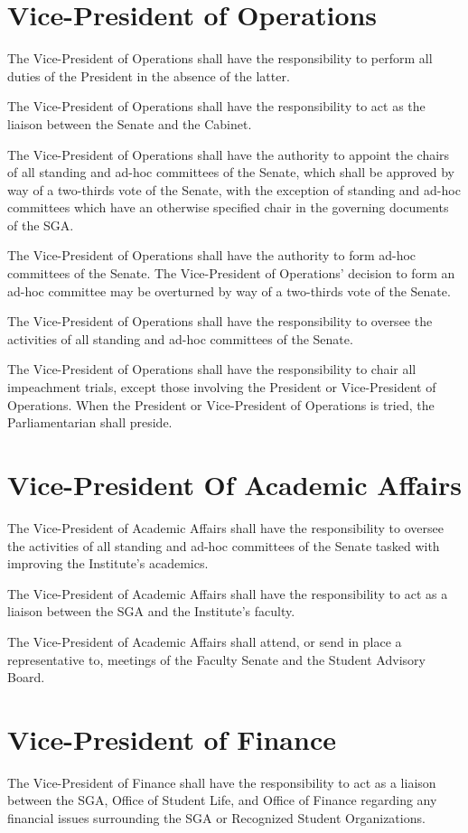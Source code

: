 \documentclass[12pt,oneside]{scrreprt}
\begin{document}
\section{Vice-President of Operations}
The Vice-President of Operations shall have the responsibility to perform all duties of the President in the absence of the latter.

The Vice-President of Operations shall have the responsibility to act as the liaison between the Senate and the Cabinet.

The Vice-President of Operations shall have the authority to appoint the chairs of all standing and ad-hoc committees of the Senate, which shall be approved by way of a two-thirds vote of the Senate, with the exception of standing and ad-hoc committees which have an otherwise specified chair in the governing documents of the SGA.

The Vice-President of Operations shall have the authority to form ad-hoc committees of the Senate. The Vice-President of Operations' decision to form an ad-hoc committee may be overturned by way of a two-thirds vote of the Senate.

The Vice-President of Operations shall have the responsibility to oversee the activities of all standing and ad-hoc committees of the Senate.

The Vice-President of Operations shall have the responsibility to chair all impeachment trials, except those involving the President or Vice-President of Operations. When the President or Vice-President of Operations is tried, the Parliamentarian shall preside.

\section{Vice-President Of Academic Affairs}
The Vice-President of Academic Affairs shall have the responsibility to oversee the activities of all standing and ad-hoc committees of the Senate tasked with improving the Institute's academics.

The Vice-President of Academic Affairs shall have the responsibility to act as a
liaison between the SGA and the Institute's faculty.

The Vice-President of Academic Affairs shall attend, or send in place a representative to, meetings of the Faculty Senate and the Student Advisory Board.

\section{Vice-President of Finance}
The Vice-President of Finance shall have the responsibility to act as a liaison between the SGA, Office of Student Life, and Office of Finance regarding any financial issues surrounding the SGA or Recognized Student Organizations.
\end{document}
